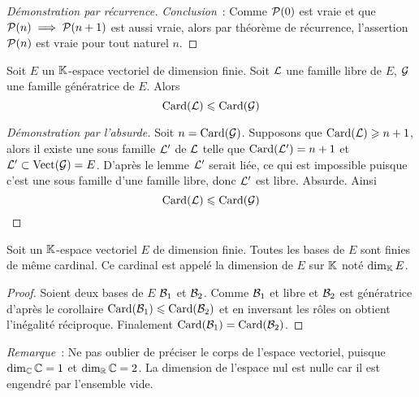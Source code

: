 \begin{proof}[Démonstration par récurrence]
  \emph{Conclusion}~: Comme \(\P(0)\) est vraie et que \(\P(n) \implies \P(n+1)\) est aussi vraie, alors par théorème de récurrence, l'assertion \(\P(n)\) est vraie pour tout naturel \(n\).
\end{proof}

\begin{cor}
  Soit \(E\) un \(\K\)-espace vectoriel de dimension finie. Soit \(\Lb\) une famille libre de \(E\), \(\G\) une famille génératrice de \(E\). Alors
  \begin{equation}
    \Card(\Lb) \leqslant \Card(\G)
  \end{equation}
\end{cor}
\begin{proof}[Démonstration par l'absurde]
  Soit \(n = \Card(\G)\). Supposons que \(\Card(\Lb) \geqslant n+1\), alors il existe une sous famille \(\Lb'\) de \(\Lb\) telle que \(\Card(\Lb')=n+1\) et \(\Lb' \subset \VectEngendre(\G)=E\). D'après le lemme \(\Lb'\) serait liée, ce qui est impossible puisque c'est une sous famille d'une famille libre, donc \(\Lb'\) est libre. Absurde.  Ainsi 
  \begin{equation}
    \Card(\Lb) \leqslant \Card(\G)
  \end{equation}
\end{proof}

\begin{theo}
    \label{theo:dim}
  Soit un \(\K\)-espace vectoriel \(E\) de dimension finie. Toutes les bases de \(E\) sont finies de même cardinal. Ce cardinal est appelé la dimension de \(E\) sur \(\K\) noté \(\Dim_\K E\).
\end{theo}
\begin{proof}
  Soient deux bases de \(E\) \(\B_1\) et \(\B_2\). Comme \(\B_1\) et libre et \(\B_2\) est génératrice d'après le corollaire \(\Card(\B_1) \leqslant \Card(\B_2)\) et en inversant les rôles on obtient l'inégalité réciproque. Finalement \(\Card(\B_1)=\Card(\B_2)\).
\end{proof}

\emph{Remarque}~: Ne pas oublier de préciser le corps de l'espace vectoriel, puisque \(\Dim_\C \C=1\) et \(\Dim_\R \C=2\). La dimension de l'espace nul est nulle car il est engendré par l'ensemble vide.


